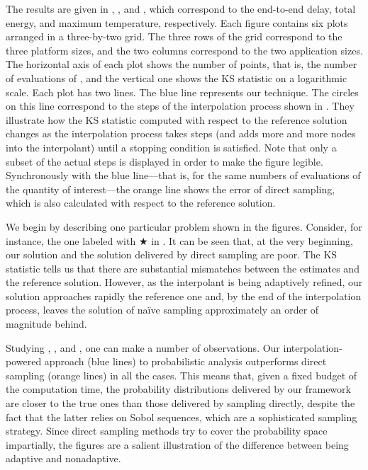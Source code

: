The results are given in ,
, and , which
correspond to the end-to-end delay, total energy, and maximum temperature,
respectively. Each figure contains six plots arranged in a three-by-two grid.
The three rows of the grid correspond to the three platform sizes, and the two
columns correspond to the two application sizes. The horizontal axis of each
plot shows the number of points, that is, the number of evaluations of \g, and
the vertical one shows the \ac{KS} statistic on a logarithmic scale. Each plot
has two lines. The blue line represents our technique. The circles on this line
correspond to the steps of the interpolation process shown in
. They illustrate how the \ac{KS} statistic computed with
respect to the reference solution changes as the interpolation process takes
steps (and adds more and more nodes into the interpolant) until a stopping
condition is satisfied. Note that only a subset of the actual steps is displayed
in order to make the figure legible. Synchronously with the blue line---that is,
for the same numbers of evaluations of the quantity of interest---the orange
line shows the error of direct sampling, which is also calculated with respect
to the reference solution.

We begin by describing one particular problem shown in the figures. Consider,
for instance, the one labeled with $\bigstar$ in .
It can be seen that, at the very beginning, our solution and the solution
delivered by direct sampling are poor. The \ac{KS} statistic tells us that there
are substantial mismatches between the estimates and the reference solution.
However, as the interpolant is being adaptively refined, our solution approaches
rapidly the reference one and, by the end of the interpolation process, leaves
the solution of naïve sampling approximately an order of magnitude behind.

Studying , , and
, one can make a number of observations. Our
interpolation-powered approach (blue lines) to probabilistic analysis
outperforms direct sampling (orange lines) in all the cases. This means that,
given a fixed budget of the computation time, the probability distributions
delivered by our framework are closer to the true ones than those delivered by
sampling \g directly, despite the fact that the latter relies on Sobol
sequences, which are a sophisticated sampling strategy. Since direct sampling
methods try to cover the probability space impartially, the figures are a
salient illustration of the difference between being adaptive and nonadaptive.

